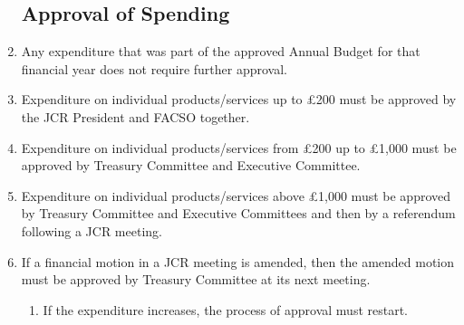 \documentclass[12pt]{article}
\begin{document}
\begin{enumerate}
    \subsection{Approval of Spending}
    \item Any expenditure that was part of the approved Annual Budget for that financial year does not require further approval.
    \item Expenditure on individual products/services up to £200 must be approved by the JCR President and FACSO together.
    \item Expenditure on individual products/services from £200 up to £1,000 must be approved by Treasury Committee and Executive Committee.
    \item Expenditure on individual products/services above £1,000 must be approved by Treasury Committee and Executive Committees and then by a referendum following a JCR meeting.
    \item If a financial motion in a JCR meeting is amended, then the amended motion must be approved by Treasury Committee at its next meeting.
    \begin{enumerate}
        \item If the expenditure increases, the process of approval must restart.
    \end{enumerate}

\end{enumerate}
\end{document}
